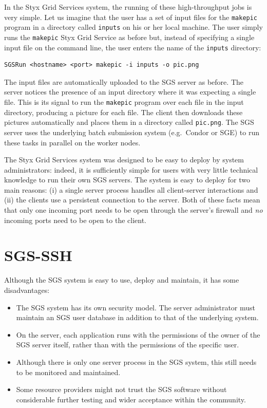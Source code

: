 \documentclass[a4paper]{article}
\begin{document}
\begin{multicols}{2}
In the Styx Grid Services system, the running of these high-throughput jobs is very simple.  Let us imagine that the user has a set of input files for the {\tt makepic} program in a directory called {\tt inputs} on his or her local machine.  The user simply runs the {\tt makepic} Styx Grid Service as before but, instead of specifying a single input file on the command line, the user enters the name of the {\tt inputs} directory:

\begin{verbatim}
SGSRun <hostname> <port> makepic -i inputs -o pic.png
\end{verbatim}

The input files are automatically uploaded to the SGS server as before.  The server notices the presence of an input directory where it was expecting a single file.  This is its signal to run the {\tt makepic} program over each file in the input directory, producing a picture for each file.  The client then downloads these pictures automatically and places them in a directory called {\tt pic.png}.  The SGS server uses the underlying batch submission system (e.g.\ Condor or SGE) to run these tasks in parallel on the worker nodes.


The Styx Grid Services system was designed to be easy to deploy by system administrators: indeed, it is sufficiently simple for users with very little technical knowledge to run their own SGS servers.  The system is easy to deploy for two main reasons: (i) a single server process handles all client-server interactions and (ii) the clients use a persistent connection to the server.  Both of these facts mean that only one incoming port needs to be open through the server's firewall and {\em no\/} incoming ports need to be open to the client.

\section{SGS-SSH}
Although the SGS system is easy to use, deploy and maintain, it has some disadvantages:

\begin{itemize}
\item The SGS system has its own security model.  The server administrator must maintain an SGS user database in addition to that of the underlying system.
\item On the server, each application runs with the permissions of the owner of the SGS server itself, rather than with the permissions of the specific user.
\item Although there is only one server process in the SGS system, this still needs to be monitored and maintained.
\item Some resource providers might not trust the SGS software without considerable further testing and wider acceptance within the community.
\end{itemize}


\end{multicols}
\end{document}

